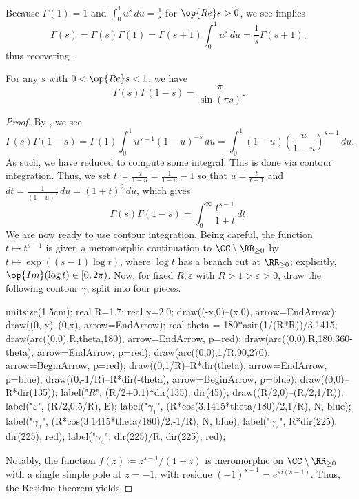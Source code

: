 \documentclass[../notes.tex]{subfiles}
\begin{document}
\begin{remark}
	Because $\Gamma(1)=1$ and $\int_0^1u^s\,du=\frac1s$ for $\op{Re}s>0$, we see  implies
	\[\Gamma(s)=\Gamma(s)\Gamma(1)=\Gamma(s+1)\int_0^1u^s\,du=\frac1s\Gamma(s+1),\]
	thus recovering .
\end{remark}
\begin{proposition} \label{prop:gamma-func-eq}
	For any $s$ with $0<\op{Re}s<1$, we have
	\[\Gamma(s)\Gamma(1-s)=\frac\pi{\sin(\pi s)}.\]
\end{proposition}
\begin{proof}
	By , we see
	\[\Gamma(s)\Gamma(1-s)=\Gamma(1)\int_0^1u^{s-1}(1-u)^{-s}\,du=\int_0^1(1-u)\left(\frac u{1-u}\right)^{s-1}\,du.\]
	As such, we have reduced to compute some integral. This is done via contour integration. Thus, we set $t\coloneqq\frac u{1-u}=\frac1{1-u}-1$ so that $u=\frac t{t+1}$ and $dt=\frac1{(1-u)^2}\,du=(1+t)^2\,du$, which gives
	\[\Gamma(s)\Gamma(1-s)=\int_0^\infty\frac{t^{s-1}}{1+t}\,dt.\]
	We are now ready to use contour integration. Being careful, the function $t\mapsto t^{s-1}$ is given a meromorphic continuation to $\CC\setminus\RR_{\ge0}$ by $t\mapsto\exp((s-1)\log t)$, where $\log t$ has a branch cut at $\RR_{\ge0}$; explicitly, $\op{Im}(\log t)\in[0,2\pi)$. Now, for fixed $R,\varepsilon$ with $R>1>\varepsilon>0$, draw the following contour $\gamma$, split into four pieces.
	\begin{center}
		\begin{asy}
			unitsize(1.5cm);
			real R=1.7;
			real x=2.0;
			draw((-x,0)--(x,0), arrow=EndArrow);
			draw((0,-x)--(0,x), arrow=EndArrow);
			real theta = 180*asin(1/(R*R))/3.1415;
			draw(arc((0,0),R,theta,180), arrow=EndArrow, p=red);
			draw(arc((0,0),R,180,360-theta), arrow=EndArrow, p=red);
			draw(arc((0,0),1/R,90,270), arrow=BeginArrow, p=red);
			draw((0,1/R)--R*dir(theta), arrow=EndArrow, p=blue);
			draw((0,-1/R)--R*dir(-theta), arrow=BeginArrow, p=blue);
			draw((0,0)--R*dir(135));
			label("$R$", (R/2+0.1)*dir(135), dir(45));
			draw((R/2,0)--(R/2,1/R));
			label("$\varepsilon$", (R/2,0.5/R), E);
			label("$\gamma_1$", (R*cos(3.1415*theta/180)/2,1/R), N, blue);
			label("$\gamma_3$", (R*cos(3.1415*theta/180)/2,-1/R), N, blue);
			label("$\gamma_2$", R*dir(225), dir(225), red);
			label("$\gamma_4$", dir(225)/R, dir(225), red);
		\end{asy}
	\end{center}
	Notably, the function $f(z)\coloneqq z^{s-1}/(1+z)$ is meromorphic on $\CC\setminus\RR_{\ge0}$ with a single simple pole at $z=-1$, with residue $(-1)^{s-1}=e^{\pi i(s-1)}$. Thus, the Residue theorem yields

\end{proof}
\end{document}
